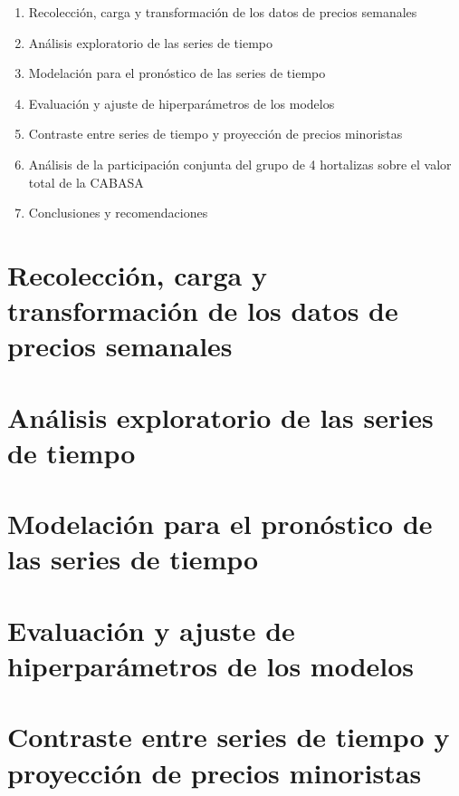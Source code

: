 \documentclass[
]{book}
\providecommand{\tightlist}{%
  \setlength{\itemsep}{0pt}\setlength{\parskip}{0pt}}
\begin{document}
\begin{enumerate}
\def\labelenumi{\arabic{enumi}.}
\tightlist
\item
  Recolección, carga y transformación de los datos de precios semanales
\item
  Análisis exploratorio de las series de tiempo
\item
  Modelación para el pronóstico de las series de tiempo
\item
  Evaluación y ajuste de hiperparámetros de los modelos
\item
  Contraste entre series de tiempo y proyección de precios minoristas
\item
  Análisis de la participación conjunta del grupo de 4 hortalizas sobre el valor total de la CABASA
\item
  Conclusiones y recomendaciones
\end{enumerate}

\hypertarget{recolecciuxf3n-carga-y-transformaciuxf3n-de-los-datos-de-precios-semanales}{%
\chapter{Recolección, carga y transformación de los datos de precios semanales}\label{recolecciuxf3n-carga-y-transformaciuxf3n-de-los-datos-de-precios-semanales}}

\hypertarget{anuxe1lisis-exploratorio-de-las-series-de-tiempo}{%
\chapter{Análisis exploratorio de las series de tiempo}\label{anuxe1lisis-exploratorio-de-las-series-de-tiempo}}

\hypertarget{modelaciuxf3n-para-el-pronuxf3stico-de-las-series-de-tiempo}{%
\chapter{Modelación para el pronóstico de las series de tiempo}\label{modelaciuxf3n-para-el-pronuxf3stico-de-las-series-de-tiempo}}

\hypertarget{evaluaciuxf3n-y-ajuste-de-hiperparuxe1metros-de-los-modelos}{%
\chapter{Evaluación y ajuste de hiperparámetros de los modelos}\label{evaluaciuxf3n-y-ajuste-de-hiperparuxe1metros-de-los-modelos}}

\hypertarget{contraste-entre-series-de-tiempo-y-proyecciuxf3n-de-precios-minoristas}{%
\chapter{Contraste entre series de tiempo y proyección de precios minoristas}\label{contraste-entre-series-de-tiempo-y-proyecciuxf3n-de-precios-minoristas}}

  
\end{document}
